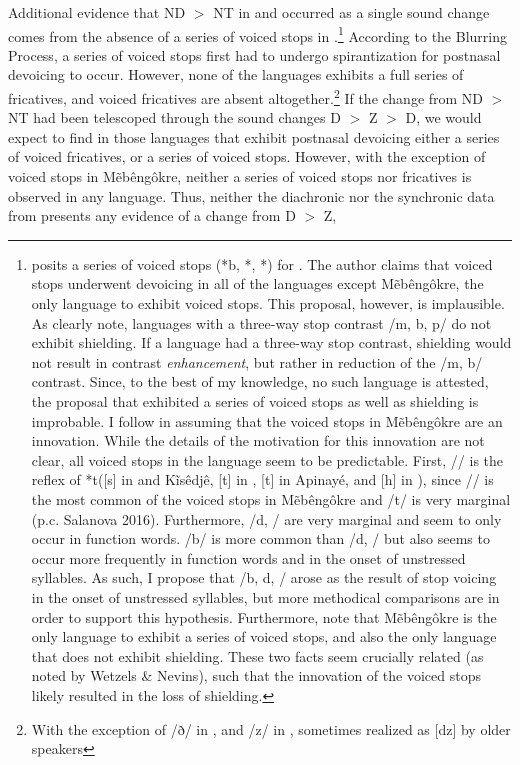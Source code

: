 \documentclass[output=paper,hidelinks]{langscibook}
\begin{document}
Additional evidence that ND $>$ NT in  and  occurred as a single sound change comes from the absence of a series of voiced stops in  \citep{Davis1966}.\footnote{\citet{Nikulin2016, Nikulin2017} posits a series of voiced stops (*b, *\textbardotlessj, *\textscriptg) for . The author claims that voiced stops underwent devoicing in all of the  languages except M\~eb\^eng\^okre, the only  language to exhibit voiced stops. This proposal, however, is implausible. As \citet{WetzelsNevins2018} clearly note, languages with a three-way stop contrast /m, b, p/ do not exhibit shielding. If a language had a three-way stop contrast, shielding would not result in contrast \textit{enhancement}, but rather in reduction of the /m, b/ contrast. Since, to the best of my knowledge, no such language is attested, the proposal that  exhibited a series of voiced stops as well as shielding is improbable. I follow \citet{Davis1966} in assuming that the voiced stops in M\~eb\^eng\^okre are an innovation. While the details of the motivation for this innovation are not clear, all voiced stops in the language seem to be predictable. First, /\textdyoghlig / is the reflex of  *t\textesh\space ([s] in  and K\~is\^edj\^e, [t] in , [t\textesh] in Apinay\'e, and [h] in ), since /\textdyoghlig / is the most common of the voiced stops in M\~eb\^eng\^okre and /t\textesh/ is very marginal (p.c. Salanova 2016). Furthermore, /d, \textscriptg / are very marginal and seem to only occur in function words. /b/ is more common than /d, \textscriptg / but also seems to occur more frequently in function words and in the onset of unstressed syllables. As such, I propose that /b, d, \textscriptg / arose as the result of stop voicing in the onset of unstressed syllables, but more methodical comparisons are in order to support this hypothesis. Furthermore, note that M\~eb\^eng\^okre is the only  language to exhibit a series of voiced stops, and also the only  language that does not exhibit shielding. These two facts seem crucially related (as noted by Wetzels \& Nevins), such that the innovation of the voiced stops likely resulted in the loss of shielding.} According to the Blurring Process, a series of voiced stops first had to undergo spirantization for postnasal devoicing to occur. However, none of the  languages exhibits a full series of fricatives, and voiced fricatives are absent altogether.\footnote{With the exception of /ð/ in , and /z/ in , sometimes realized as [dz] by older  speakers} If the change from ND $>$ NT had been telescoped through the sound changes D $>$ Z $>$ D, we would expect to find in those languages that exhibit postnasal devoicing either a series of voiced fricatives, or a series of voiced stops. However, with the exception of voiced stops in M\~eb\^eng\^okre, neither a series of voiced stops nor fricatives is observed in any  language. Thus, neither the diachronic nor the synchronic data from  presents any evidence of a change from D $>$ Z, 
\end{document}
